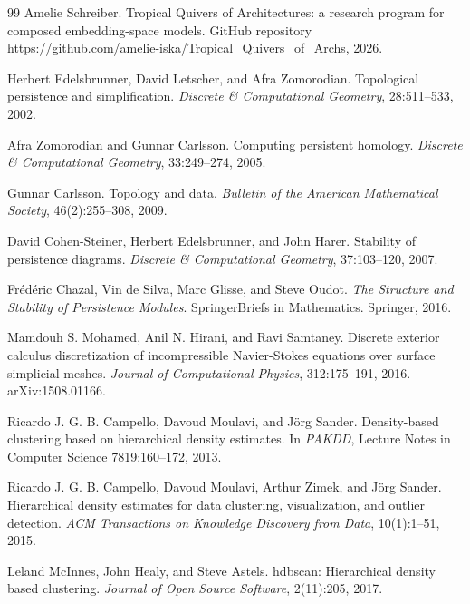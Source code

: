 \documentclass[11pt]{article}
\theoremstyle{definition}
\theoremstyle{plain}
\theoremstyle{remark}
\numberwithin{equation}{section}
\begin{document}
\begin{thebibliography}{99}
Amelie Schreiber.
\newblock Tropical Quivers of Architectures: a research program for composed embedding-space models.
\newblock GitHub repository \url{https://github.com/amelie-iska/Tropical_Quivers_of_Archs}, 2026.

Herbert Edelsbrunner, David Letscher, and Afra Zomorodian.
\newblock Topological persistence and simplification.
\newblock \emph{Discrete \& Computational Geometry}, 28:511--533, 2002.

Afra Zomorodian and Gunnar Carlsson.
\newblock Computing persistent homology.
\newblock \emph{Discrete \& Computational Geometry}, 33:249--274, 2005.

Gunnar Carlsson.
\newblock Topology and data.
\newblock \emph{Bulletin of the American Mathematical Society}, 46(2):255--308, 2009.

David Cohen-Steiner, Herbert Edelsbrunner, and John Harer.
\newblock Stability of persistence diagrams.
\newblock \emph{Discrete \& Computational Geometry}, 37:103--120, 2007.

Fr\'ed\'eric Chazal, Vin de Silva, Marc Glisse, and Steve Oudot.
\newblock \emph{The Structure and Stability of Persistence Modules}.
\newblock SpringerBriefs in Mathematics. Springer, 2016.

Mamdouh S. Mohamed, Anil N. Hirani, and Ravi Samtaney.
\newblock Discrete exterior calculus discretization of incompressible Navier-Stokes equations over surface simplicial meshes.
\newblock \emph{Journal of Computational Physics}, 312:175--191, 2016. arXiv:1508.01166.

Ricardo J. G. B. Campello, Davoud Moulavi, and J\"org Sander.
\newblock Density-based clustering based on hierarchical density estimates.
\newblock In \emph{PAKDD}, Lecture Notes in Computer Science 7819:160--172, 2013.

Ricardo J. G. B. Campello, Davoud Moulavi, Arthur Zimek, and J\"org Sander.
\newblock Hierarchical density estimates for data clustering, visualization, and outlier detection.
\newblock \emph{ACM Transactions on Knowledge Discovery from Data}, 10(1):1--51, 2015.

Leland McInnes, John Healy, and Steve Astels.
\newblock hdbscan: Hierarchical density based clustering.
\newblock \emph{Journal of Open Source Software}, 2(11):205, 2017.


\end{thebibliography}
\end{document}
